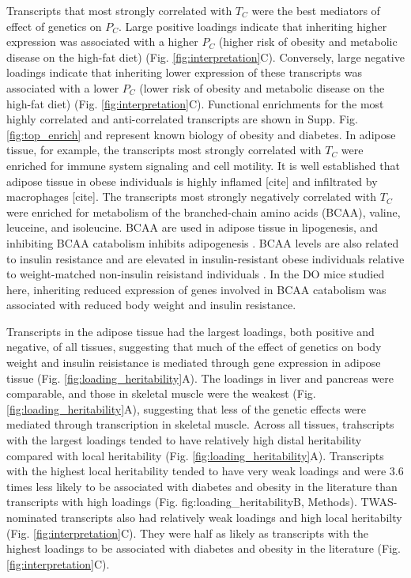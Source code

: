 \documentclass[
]{article}
\begin{document}
Transcripts that most strongly correlated with \(T_C\) were the best
mediators of effect of genetics on \(P_C\). Large positive loadings
indicate that inheriting higher expression was associated with a higher
\(P_C\) (higher risk of obesity and metabolic disease on the high-fat
diet) (Fig. \ref{fig:interpretation}C). Conversely, large negative
loadings indicate that inheriting lower expression of these transcripts
was associated with a lower \(P_C\) (lower risk of obesity and metabolic
disease on the high-fat diet) (Fig. \ref{fig:interpretation}C).
Functional enrichments for the most highly correlated and
anti-correlated transcripts are shown in Supp. Fig. \ref{fig:top_enrich}
and represent known biology of obesity and diabetes. In adipose tissue,
for example, the transcripts most strongly correlated with \(T_C\) were
enriched for immune system signaling and cell motility. It is well
established that adipose tissue in obese individuals is highly inflamed
{[}cite{]} and infiltrated by macrophages {[}cite{]}. The transcripts
most strongly negatively correlated with \(T_C\) were enriched for
metabolism of the branched-chain amino acids (BCAA), valine, leuceine,
and isoleucine. BCAA are used in adipose tissue in lipogenesis, and
inhibiting BCAA catabolism inhibits adipogenesis \cite{pmid26571352}.
BCAA levels are also related to insulin resistance and are elevated in
insulin-resistant obese individuals relative to weight-matched
non-insulin reisistand individuals \cite{pmid23512805}. In the DO mice
studied here, inheriting reduced expression of genes involved in BCAA
catabolism was associated with reduced body weight and insulin
resistance.

Transcripts in the adipose tissue had the largest loadings, both
positive and negative, of all tissues, suggesting that much of the
effect of genetics on body weight and insulin reisistance is mediated
through gene expression in adipose tissue (Fig.
\ref{fig:loading_heritability}A). The loadings in liver and pancreas
were comparable, and those in skeletal muscle were the weakest (Fig.
\ref{fig:loading_heritability}A), suggesting that less of the genetic
effects were mediated through transcription in skeletal muscle. Across
all tissues, trahscripts with the largest loadings tended to have
relatively high distal heritability compared with local heritability
(Fig. \ref{fig:loading_heritability}A). Transcripts with the highest
local heritability tended to have very weak loadings and were 3.6 times
less likely to be associated with diabetes and obesity in the literature
than transcripts with high loadings (Fig. fig:loading\_heritabilityB,
Methods). TWAS-nominated transcripts also had relatively weak loadings
and high local heritabilty (Fig. \ref{fig:interpretation}C). They were
half as likely as transcripts with the highest loadings to be associated
with diabetes and obesity in the literature (Fig.
\ref{fig:interpretation}C).
\end{document}
